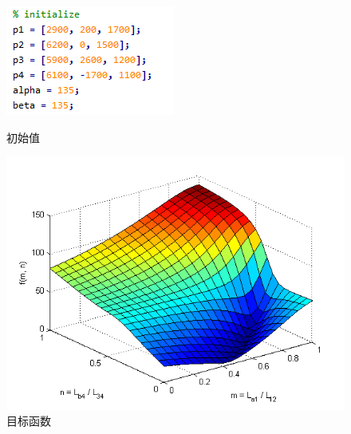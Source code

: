 \documentclass[a4paper]{ctexart}
\begin{document}
\begin{figure}
  \begin{minipage}[t]{0.3\textwidth}
    \centering
    \includegraphics[width=\textwidth]{init.png}
    \caption{初始值}
    \label{init}
  \end{minipage}
  \begin{minipage}[t]{0.7\textwidth}
    \centering
    \includegraphics[width=\textwidth]{graph.png}
    \caption{目标函数}
    \label{graph}
  \end{minipage}
\end{figure}
\end{document}
